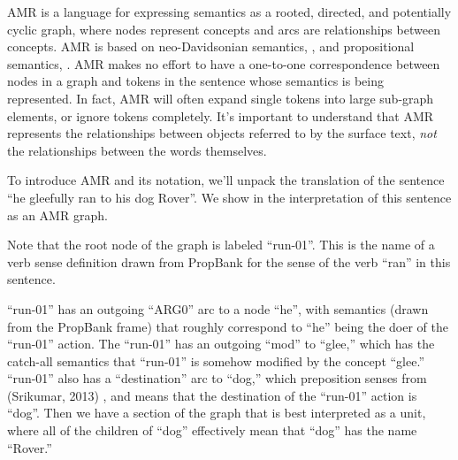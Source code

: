 \documentclass[11pt]{article}
\begin{document}


AMR is a language for expressing semantics as a rooted, directed, and potentially cyclic graph, where nodes represent concepts and arcs are relationships between concepts.
AMR is based on neo-Davidsonian semantics, \cite{Davidson:1967}, and propositional semantics, \cite{Parsons:1990}.
AMR makes no effort to have a one-to-one correspondence between nodes in a graph and tokens in the sentence whose semantics is being represented.
In fact, AMR will often expand single tokens into large sub-graph elements, or ignore tokens completely.
It's important to understand that AMR represents the relationships between objects referred to by the surface text, \textit{not} the relationships between the words themselves.

To introduce AMR and its notation, we'll unpack the translation of the sentence ``he gleefully ran to his dog Rover''. We show in  the interpretation of this sentence as an AMR graph.

Note that the root node of the graph is labeled ``run-01''. This is the name of a verb sense definition drawn from PropBank \needcite for the sense of the verb ``ran'' in this sentence.

``run-01'' has an outgoing ``ARG0'' arc to a node ``he'', with semantics (drawn from the PropBank frame) that roughly correspond to ``he'' being the doer of the ``run-01'' action. The ``run-01'' has an outgoing ``mod'' to ``glee,'' which has the catch-all semantics that ``run-01'' is somehow modified by the concept ``glee.'' ``run-01'' also has a ``destination'' arc to ``dog,'' which preposition senses from (Srikumar, 2013) \needcite, and means that the destination of the ``run-01'' action is ``dog''. Then we have a section of the graph that is best interpreted as a unit, where all of the children of ``dog'' effectively mean that ``dog'' has the name ``Rover.''

\end{document}
